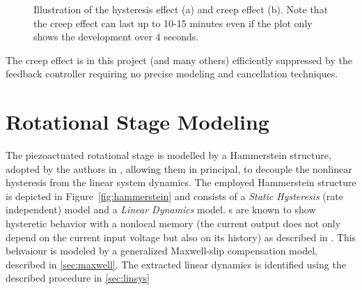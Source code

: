 \begin{figure}[h!]
  \centering %
  \qquad
  \caption{\label{fig:effects} Illustration of the hysteresis effect (a) and creep effect (b). Note that the creep effect can last up to 10-15 minutes even if the plot only shows the development over 4 seconds.}
\end{figure}

The creep effect is in this project (and many others) efficiently suppressed by the feedback controller requiring no precise modeling and cancellation techniques.

\section{Rotational Stage Modeling}
The piezoactuated rotational stage is modelled by a Hammerstein structure, adopted by the authors in \cite{ButcherController:2015}, allowing them in principal, to decouple the nonlinear hysteresis from the linear system dynamics. The employed Hammerstein structure is depicted in Figure~\ref{fig:hammerstein} and consists of a \emph{Static Hysteresis} (rate independent) model and a \emph{Linear Dynamics} model. {\abbrPEA}s are known to show hysteretic behavior with a nonlocal memory (the current output does not only depend on the current input voltage but also on its history) as described in \cite{ButcherIdentification:2015}. This behvaiour is modeled by a generalized Maxwell-slip compensation model, described in \ref{sec:maxwell}. The extracted linear dynamics is identified using the described procedure in \ref{sec:linsys}


